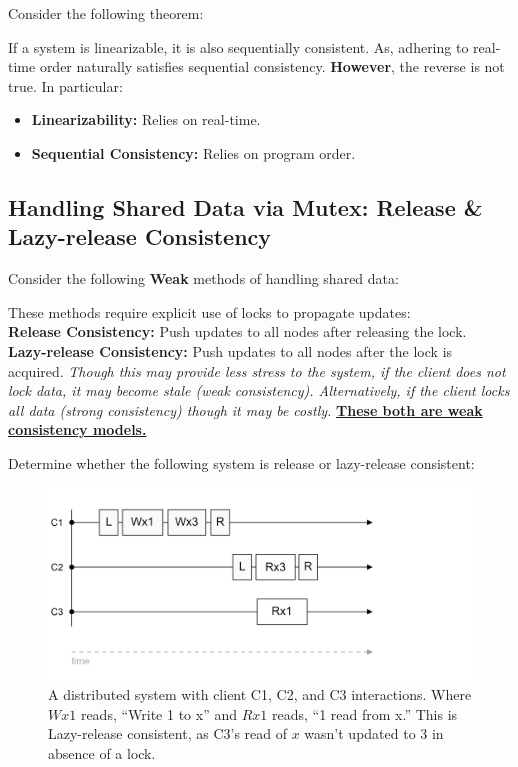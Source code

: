 \noindent
Consider the following theorem:
\begin{theo}
    
    If a system is linearizable, it is also sequentially consistent. As,  adhering to real-time order naturally satisfies sequential consistency.
    \textbf{However}, the reverse is not true. In particular:
    \begin{itemize}
        \item \textbf{Linearizability:} Relies on real-time.
        \item \textbf{Sequential Consistency:} Relies on program order.
    \end{itemize}
\end{theo}

\subsection{Handling Shared Data via Mutex: Release \& Lazy-release Consistency}

\noindent
Consider the following \textbf{Weak} methods of handling shared data:
\begin{Def}
    
    These methods require explicit use of locks to propagate updates:\\
    \textbf{Release Consistency:} Push updates to all nodes after releasing the lock.\\
    \textbf{Lazy-release Consistency:} Push updates to all nodes after the lock is acquired.
    \textit{Though this may provide less stress to the system, if the client does not lock data, it may become stale (weak consistency).
    Alternatively, if the client locks all data (strong consistency) though it may be costly. }\underline{\textbf{These both are weak consistency models.}}
\end{Def}

\noindent
Determine whether the following system is release or lazy-release consistent:

\begin{figure}[h]
    \centering
    \includegraphics[width=.9\textwidth]{Sections/consist/rel.png}
    \caption{A distributed system with client C1, C2, and C3 interactions. Where $Wx1$ reads, ``Write 1 to x'' and $Rx1$ reads, ``1 read from x.'' This 
    is Lazy-release consistent, as C3's read of $x$ wasn't updated to 3 in absence of a lock.}
\end{figure}
\newpage 

